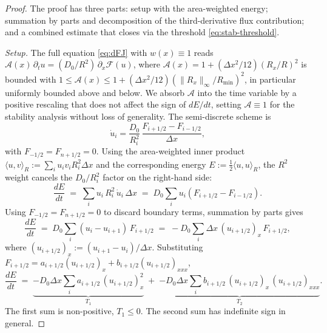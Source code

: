 \documentclass[10pt,a4paper]{amsart}
\begin{document}
\begin{proof}
   The proof has three parts: setup with the area-weighted energy; summation by parts and decomposition of the third-derivative flux contribution; and a combined estimate that closes via the threshold \eqref{eq:stab-threshold}.

    \emph{Setup.}
    The full equation \eqref{eq:dFJ} with $w(x) \equiv 1$ reads $\mathcal{A}(x)\, \partial_t u = (D_0/R^2)\, \partial_x \mathcal{F}(u)$, where $\mathcal{A}(x) = 1 + (\Delta x^2/12)(R_x/R)^2$ is bounded with $1 \le \mathcal{A}(x) \le 1 + (\Delta x^2/12)(\|R_x\|_\infty/R_{\min})^2$, in particular uniformly bounded above and below. We absorb $\mathcal{A}$ into the time variable by a positive rescaling that does not affect the sign of $dE/dt$, setting $\mathcal{A} \equiv 1$ for the stability analysis without loss of generality. The semi-discrete scheme is
    \begin{equation}
        \dot{u}_i = \frac{D_0}{R_i^2}\, \frac{F_{i+1/2} - F_{i-1/2}}{\Delta x},
    \end{equation}
    with $F_{-1/2} = F_{n+1/2} = 0$. Using the area-weighted inner product $\langle u, v\rangle_R := \sum_i u_i v_i R_i^2 \Delta x$ and the corresponding energy $E := \tfrac{1}{2}\langle u, u\rangle_R$, the $R^2$ weight cancels the $D_0/R_i^2$ factor on the right-hand side:
    \begin{equation}
        \frac{dE}{dt} \;=\; \sum_i u_i\, R_i^2 \, \dot u_i\, \Delta x \;=\; D_0 \sum_i u_i (F_{i+1/2} - F_{i-1/2}).
    \end{equation}
    Using $F_{-1/2} = F_{n+1/2} = 0$ to discard boundary terms, summation by parts gives
    \begin{equation}
        \frac{dE}{dt} \;=\; D_0 \sum_i (u_i - u_{i+1})\, F_{i+1/2} \;=\; -D_0 \sum_i \Delta x\, (u_{i+1/2})_x\, F_{i+1/2},
    \end{equation}
    where $(u_{i+1/2})_x := (u_{i+1} - u_i)/\Delta x$. Substituting $F_{i+1/2} = a_{i+1/2}(u_{i+1/2})_x + b_{i+1/2}(u_{i+1/2})_{xxx}$,
    \begin{equation}
        \frac{dE}{dt} \;=\; \underbrace{-D_0 \Delta x \sum_i a_{i+1/2}\, (u_{i+1/2})_x^2}_{T_1} \;+\; \underbrace{-D_0 \Delta x \sum_i b_{i+1/2}\, (u_{i+1/2})_x\, (u_{i+1/2})_{xxx}}_{T_2}.
    \end{equation}
    The first sum is non-positive, $T_1 \leq 0$. The second sum has indefinite sign in general.


\end{proof}
\end{document}
